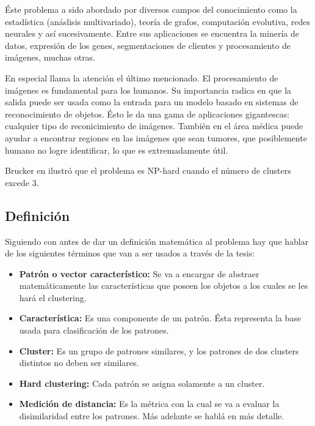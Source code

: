 \'Este problema a sido abordado por diversos campos del conocimiento como la estad\'istica
(an\'aslisis multivariado), teor\'ia de grafos, computaci\'on evolutiva, redes neurales y
as\'i sucesivamente\cite{SwAjAm2009}. Entre sus aplicaciones se encuentra la miner\'ia de datos, expresi\'on de los genes, 
segmentaciones de clientes y procesamiento de im\'agenes, muchas otras. \cite{GaChJi2007}

En especial llama la atenci\'on el \'ultimo mencionado. El procesamiento de im\'agenes es fundamental para los
humanos. Su importancia radica en que la salida puede ser usada como la entrada para 
un modelo basado en sistemas de reconocimiento de objetos.
\'Esto le da una gama de aplicaciones gigantescas: cualquier tipo de reconicimiento de im\'agenes.
Tambi\'en en el \'area m\'edica puede ayudar a encontrar regiones en las im\'agenes que sean tumores,
que posiblemente humano no logre identificar, lo que es extremadamente
\'util.

Brucker en \cite{Br1978} ilustr\'o que el problema es NP-hard cuando el n\'umero 
de clusters excede 3.

\subsection{Definici\'on} \label{sect:dclustdef} \label{sect:dclustd}

Siguiendo con \cite{SwAjAm2009} antes de dar un definici\'on matem\'atica al problema hay que hablar de 
los siguientes t\'erminos que van a ser usados a trav\'es de la tesis:

\begin{itemize}

\item {\bf Patr\'on o vector caracter\'istico:} Se va a encargar de abstraer matem\'aticamente las
caracter\'isticas que poseen los objetos a los cuales se les har\'a el clustering.

\item {\bf Caracter\'istica:} Es una componente de un patr\'on. \'Esta representa
la base usada para clasificaci\'on de los patrones.

\item {\bf Cluster:} Es un grupo de patrones similares, y los patrones de dos clusters 
distintos no deben ser similares.

\item {\bf Hard clustering:} Cada patr\'on se asigna solamente a un cluster.

\item {\bf Medici\'on de distancia:} Es la m\'etrica con la cual se va a evaluar
la disimilaridad entre los patrones. M\'as adelante se habl\'a en m\'as detalle.

\end{itemize}


